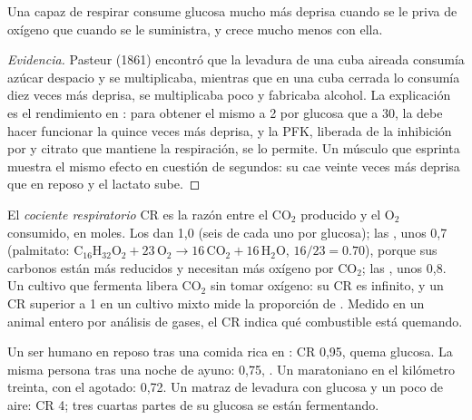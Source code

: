\begin{proposition}\label{prop:b1:respiration-fermentation:pasteur}
Una  capaz de respirar consume glucosa mucho más deprisa cuando se le
priva de oxígeno que cuando se le suministra, y crece mucho menos con ella.
\end{proposition}
\begin{proof}[Evidencia]
Pasteur (1861) encontró que la levadura de una cuba aireada consumía azúcar
despacio y se multiplicaba, mientras que en una cuba cerrada lo consumía
diez veces más deprisa, se multiplicaba poco y fabricaba alcohol. La
explicación es el rendimiento en : para obtener el mismo  a 2 por
glucosa que a 30, la  debe hacer funcionar la  quince veces
más deprisa, y la PFK, liberada de la inhibición por  y citrato que
mantiene la respiración, se lo permite. Un músculo que esprinta muestra el
mismo efecto en cuestión de segundos: su  cae veinte veces más
deprisa que en reposo y el lactato sube.
\end{proof}

\begin{definition}\label{def:b1:respiration-fermentation:rq}
El \emph{cociente respiratorio} CR es la razón entre el $\mathrm{CO_2}$
producido y el $\mathrm{O_2}$ consumido, en moles. Los  dan 1,0
(seis de cada uno por glucosa); las , unos 0,7 (palmitato:
$\mathrm{C_{16}H_{32}O_2} + 23\,\mathrm{O_2} \to 16\,\mathrm{CO_2} +
16\,\mathrm{H_2O}$, $16/23 = 0.70$), porque sus carbonos están más reducidos
y necesitan más oxígeno por $\mathrm{CO_2}$; las , unos 0,8. Un
cultivo que fermenta libera $\mathrm{CO_2}$ sin tomar oxígeno: su CR es
infinito, y un CR superior a 1 en un cultivo mixto mide la proporción de
. Medido en un animal entero por análisis de gases, el CR indica
qué combustible está quemando.
\end{definition}

\begin{example}\label{ex:b1:respiration-fermentation:readrq}
Un ser humano en reposo tras una comida rica en : CR 0,95, quema
glucosa. La misma persona tras una noche de ayuno: 0,75, . Un
maratoniano en el kilómetro treinta, con el  agotado: 0,72. Un
matraz de levadura con glucosa y un poco de aire: CR 4; tres cuartas partes
de su glucosa se están fermentando.
\end{example}


